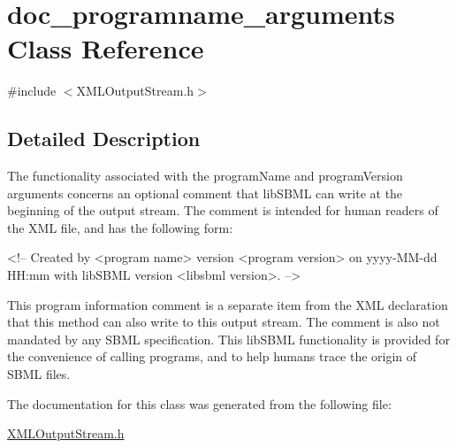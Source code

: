 \hypertarget{classdoc__programname__arguments}{}\section{doc\+\_\+programname\+\_\+arguments Class Reference}
\label{classdoc__programname__arguments}


{\ttfamily \#include $<$X\+M\+L\+Output\+Stream.\+h$>$}



\subsection{Detailed Description}
\begin{DoxyParagraph}{}
The functionality associated with the {\ttfamily program\+Name} and {\ttfamily program\+Version} arguments concerns an optional comment that lib\+S\+B\+ML can write at the beginning of the output stream. The comment is intended for human readers of the X\+ML file, and has the following form\+: \begin{DoxyVerb}<!-- Created by <program name> version <program version>
on yyyy-MM-dd HH:mm with libSBML version <libsbml version>. -->
\end{DoxyVerb}

\end{DoxyParagraph}
This program information comment is a separate item from the X\+ML declaration that this method can also write to this output stream. The comment is also not mandated by any S\+B\+ML specification. This lib\+S\+B\+ML functionality is provided for the convenience of calling programs, and to help humans trace the origin of S\+B\+ML files. 

The documentation for this class was generated from the following file\+:\begin{DoxyCompactItemize}
\item 
\hyperlink{_x_m_l_output_stream_8h}{X\+M\+L\+Output\+Stream.\+h}\end{DoxyCompactItemize}
